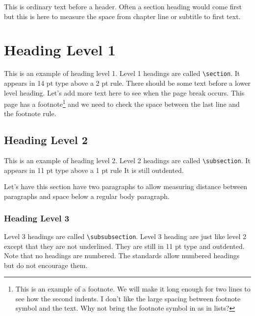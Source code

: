 This is ordinary text before a header. Often a section heading would
come first but this is here to measure the space from chapter line or
subtitle to first text.

\section{Heading Level 1}
This is an example of heading level 1. Level 1 headings are called
\verb|\section|.  It appears in 14 pt type above
a 2 pt rule.  There should be some text before a lower level heading.
Let's add more text here to see when the page break occurs. This page
has a footnote\footnote{This is an example of a footnote.  We will
make it long enough for two lines to see how the second indents.  I
don't like the large spacing between footnote symbol and the text.
Why not bring the footnote symbol in as in lists?} and we need to
check the space between the last line and the footnote rule.


\subsection{Heading Level 2}


This is an example of heading level 2.  Level 2 headings are called
\verb|\subsection|.  It appears in 11 pt type above
a 1 pt rule It is still outdented.


Let's have this section have two paragraphs to allow measuring distance 
between paragraphs and space below a regular body paragraph.


\subsubsection{Heading Level 3}


Level 3 headings are called \verb|\subsubsection|.  Level 3 heading are just
like level 2 except that they are not underlined. They are still in 11
pt type and outdented. Note that no headings are numbered. The
standards allow numbered headings but do not encourage them.


